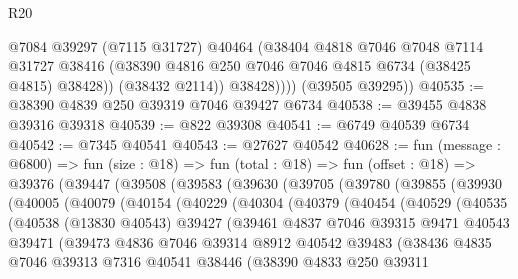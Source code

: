 \begin{lexlean}{R20}
\begin{coremodule}
{                @7084
                @39297
                (@7115 @31727)
                @40464
                (@38404
                  @4818
                  @7046
                  @7048
                  @7114
                  @31727
                  @38416
                  (@38390 @4816 @250 @7046 @7046 @4815 @6734 (@38425 @4815) @38428))
                (@38432 @2114))
              @38428))))
      (@39505 @39295))
@40535 := @38390 @4839 @250 @39319 @7046 @39427 @6734
@40538 := @39455 @4838 @39316 @39318
@40539 := @822 @39308
@40541 := @6749 @40539 @6734
@40542 := @7345 @40541
@40543 := @27627 @40542
@40628 := fun (message : @6800) =>
  fun (size : @18) =>
  fun (total : @18) =>
  fun (offset : @18) =>
  @39376
    (@39447
      (@39508
        (@39583
          (@39630
            (@39705
              (@39780
                (@39855
                  (@39930
                    (@40005
                      (@40079
                        (@40154
                          (@40229
                            (@40304
                              (@40379
                                (@40454
                                  (@40529
                                    (@40535
                                      (@40538
                                        (@13830 @40543)
                                        @39427
                                        (@39461
                                          @4837
                                          @7046
                                          @39315
                                          @9471
                                          @40543
                                          @39471
                                          (@39473
                                            @4836
                                            @7046
                                            @39314
                                            @8912
                                            @40542
                                            @39483
                                            (@38436
                                              @4835
                                              @7046
                                              @39313
                                              @7316
                                              @40541
                                              @38446
                                              (@38390
                                                @4833
                                                @250
                                                @39311
}
\end{coremodule}
\end{lexlean}
